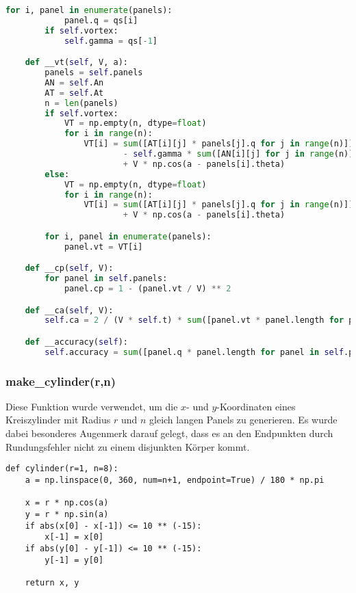 \begin{lstlisting}[language=Python]
        for i, panel in enumerate(panels):
            panel.q = qs[i]
        if self.vortex:
            self.gamma = qs[-1]

    def __vt(self, V, a):
        panels = self.panels
        AN = self.An
        AT = self.At
        n = len(panels)
        if self.vortex:
            VT = np.empty(n, dtype=float)
            for i in range(n):
                VT[i] = sum([AT[i][j] * panels[j].q for j in range(n)]) \
                        - self.gamma * sum([AN[i][j] for j in range(n)]) \
                        + V * np.cos(a - panels[i].theta)
        else:
            VT = np.empty(n, dtype=float)
            for i in range(n):
                VT[i] = sum([AT[i][j] * panels[j].q for j in range(n)]) \
                        + V * np.cos(a - panels[i].theta)

        for i, panel in enumerate(panels):
            panel.vt = VT[i]

    def __cp(self, V):
        for panel in self.panels:
            panel.cp = 1 - (panel.vt / V) ** 2

    def __ca(self, V):
        self.ca = 2 / (V * self.t) * sum([panel.vt * panel.length for panel in self.panels])

    def __accuracy(self):
        self.accuracy = sum([panel.q * panel.length for panel in self.panels])


\end{lstlisting}

\subsubsection{make\_cylinder(r,n)}
Diese Funktion wurde verwendet, um die $x$- und $y$-Koordinaten eines Kreiszylinder mit Radius $r$ und $n$ gleich langen Panels zu generieren. Es wurde dabei besonderes Augenmerk darauf gelegt, dass es an den Endpunkten durch Rundungsfehler nicht zu einem disjunkten Körper kommt.
\begin{lstlisting}
def cylinder(r=1, n=8):
    a = np.linspace(0, 360, num=n+1, endpoint=True) / 180 * np.pi

    x = r * np.cos(a)
    y = r * np.sin(a)
    if abs(x[0] - x[-1]) <= 10 ** (-15):
        x[-1] = x[0]
    if abs(y[0] - y[-1]) <= 10 ** (-15):
        y[-1] = y[0]

    return x, y
\end{lstlisting}

